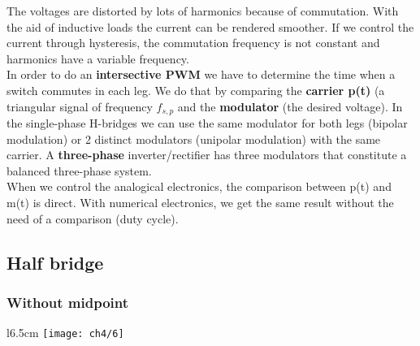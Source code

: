 	 The voltages are distorted by lots of harmonics because of commutation. With the aid of inductive loads the current can be rendered smoother. If we control the current through hysteresis, the commutation frequency is not constant and harmonics have a variable frequency. \\
	 In order to do an \textbf{intersective PWM} we have to determine the time when a switch commutes in each leg. We do that by comparing the \textbf{carrier p(t)} (a triangular signal of frequency $f_{s,p}$ and the \textbf{modulator} (the desired voltage). In the single-phase H-bridges we can use the same modulator for both legs (bipolar modulation) or 2 distinct modulators (unipolar modulation) with the same carrier. A \textbf{three-phase} inverter/rectifier has three modulators that constitute a balanced three-phase system. \\
	 
	 When we control the analogical electronics, the comparison between p(t) and m(t) is direct. With numerical electronics, we get the same result without the need of a comparison (duty cycle). 
	 
	 \subsection{Half bridge}
	 	\subsubsection{Without midpoint}
	 		\begin{wrapfigure}[8]{l}{6.5cm}
			\vspace{-5mm}
			\texttt{[image: ch4/6]}
			\end{wrapfigure}
			
